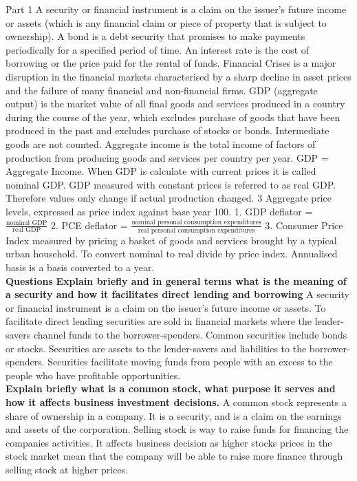 \documentclass[12pt]{examnotes}
\begin{document}
\obeylines  

\h{Part 1}
A security or financial instrument is a claim on the issuer’s future income or assets (which is any financial claim or piece of property that is subject to ownership). 
A bond is a debt security that promises to make payments periodically for a specified period of time. 
An interest rate is the cost of borrowing or the price paid for the rental of funds. 
Financial Crises is a  major disruption in the financial markets characterised by a sharp decline in asset prices and the failure of many financial and non-financial firms. 
GDP (aggregate output) is the market value of all final goods and services produced in a country during the course of the year, which excludes purchase of goods that have been produced in the past and excludes purchase of stocks or bonds. Intermediate goods are not counted.
Aggregate income is the total income of factors of production from producing goods and services per country per year. 
GDP = Aggregate Income. 
When GDP is calculate with current prices it is called nominal GDP. 
GDP measured with constant prices is referred to as real GDP. Therefore values only change if actual production changed.
3 Aggregate price levels, expressed as price index against base year 100.
1. GDP deflator =  $\frac{\text{nominal GDP}}{\text{real GDP}}$ 
2. PCE deflator =  $\frac{\text{nominal personal consumption expenditures}}{\text{real personal consumption expenditures}}$ 
3. Consumer Price Index measured by pricing a basket of goods and services brought by a typical urban household.
To convert nominal to real divide by price index. Annualised basis is a basis converted to a year. \\

\textbf{Questions}
\textbf{Explain briefly and in general terms what is the meaning of a security and how it facilitates direct lending and borrowing}
A security or financial instrument is a claim on the issuer's future income or assets. To facilitate direct lending securities are sold in financial markets where the lender-savers channel funds to the borrower-spenders. Common securities include bonds or stocks. Securities are assets to the lender-savers and liabilities to the borrower-spenders. Securities facilitate moving funds from people with an excess to the people who have profitable opportunities. \\

\textbf{Explain briefly what is a common stock, what purpose it serves and how it affects business investment decisions.}
A common stock represents a share of ownership in a company. It is a security, and is a claim on the earnings and assets of the corporation. Selling stock is way to raise funds for financing the companies activities. It affects business decision as higher stocks prices in the stock market mean that the company will be able to raise more finance through selling stock at higher prices. \\
\end{document}
